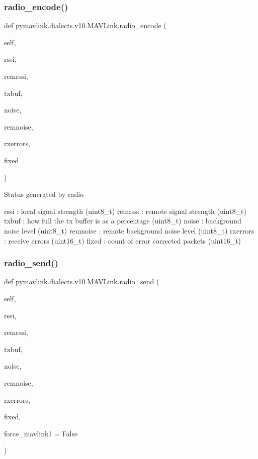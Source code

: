 \begin{DoxyVerb}
\begin{DoxyVerb}
\begin{DoxyVerb}
\begin{DoxyVerb}
\subsubsection{\texorpdfstring{radio\+\_\+encode()}{radio\_encode()}}
{\footnotesize\ttfamily def pymavlink.\+dialects.\+v10.\+M\+A\+V\+Link.\+radio\+\_\+encode (\begin{DoxyParamCaption}\item[{}]{self,  }\item[{}]{rssi,  }\item[{}]{remrssi,  }\item[{}]{txbuf,  }\item[{}]{noise,  }\item[{}]{remnoise,  }\item[{}]{rxerrors,  }\item[{}]{fixed }\end{DoxyParamCaption})}

\begin{DoxyVerb}Status generated by radio

rssi                      : local signal strength (uint8_t)
remrssi                   : remote signal strength (uint8_t)
txbuf                     : how full the tx buffer is as a percentage (uint8_t)
noise                     : background noise level (uint8_t)
remnoise                  : remote background noise level (uint8_t)
rxerrors                  : receive errors (uint16_t)
fixed                     : count of error corrected packets (uint16_t)\end{DoxyVerb}
 \mbox{\label{classpymavlink_1_1dialects_1_1v10_1_1MAVLink_a7b76e716c0410ab62acab9d496697ea1}} 
\subsubsection{\texorpdfstring{radio\+\_\+send()}{radio\_send()}}
{\footnotesize\ttfamily def pymavlink.\+dialects.\+v10.\+M\+A\+V\+Link.\+radio\+\_\+send (\begin{DoxyParamCaption}\item[{}]{self,  }\item[{}]{rssi,  }\item[{}]{remrssi,  }\item[{}]{txbuf,  }\item[{}]{noise,  }\item[{}]{remnoise,  }\item[{}]{rxerrors,  }\item[{}]{fixed,  }\item[{}]{force\+\_\+mavlink1 = {\ttfamily False} }\end{DoxyParamCaption})}


\end{DoxyVerb}
\end{DoxyVerb}
\end{DoxyVerb}
\end{DoxyVerb}
